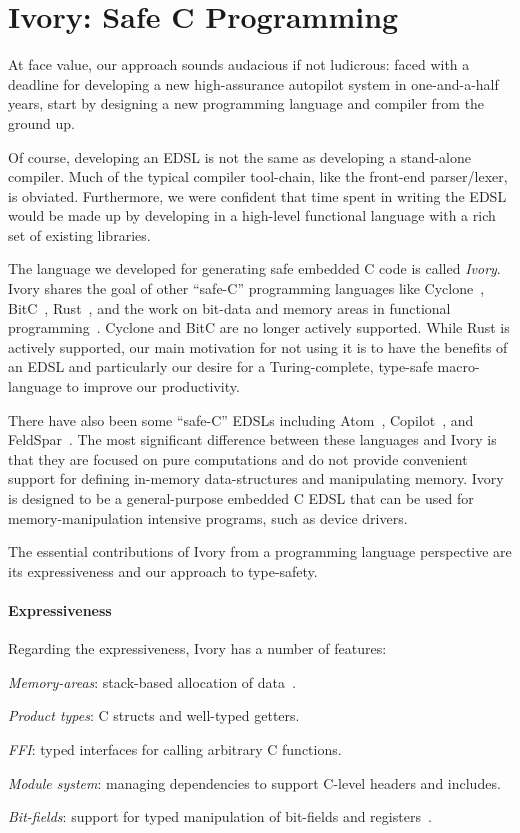 \section{Ivory: Safe C Programming}
\label{sec:ivory}

At face value, our approach sounds audacious if not ludicrous: faced with a
deadline for developing a new high-assurance autopilot system in one-and-a-half
years, start by designing a new programming language and compiler from the
ground up.

Of course, developing an EDSL is not the same as developing a stand-alone
compiler.  Much of the typical compiler tool-chain, like the front-end
parser/lexer, is obviated.  Furthermore, we were confident that time spent in
writing the EDSL would be made up by developing in a high-level functional
language with a rich set of existing libraries.

The language we developed for generating safe embedded C code is called
\emph{Ivory}.  Ivory shares the goal of other ``safe-C'' programming languages
like Cyclone~\cite{cyclone}, BitC~\cite{bitc}, Rust~\cite{rust}, and the work on
bit-data and memory areas in functional programming~\cite{high-level,memareas}.
Cyclone and BitC are no longer actively supported.  While Rust is actively
supported, our main motivation for not using it is to have the benefits of an
EDSL and particularly our desire for a Turing-complete, type-safe macro-language
to improve our productivity.

There have also been some ``safe-C'' EDSLs including Atom~\cite{atom},
Copilot~\cite{copilot}, and FeldSpar~\cite{feldspar1}.  The most significant
difference between these languages and Ivory is that they are focused on pure
computations and do not provide convenient support for defining in-memory
data-structures and manipulating memory.  Ivory is designed to be a
general-purpose embedded C EDSL that can be used for memory-manipulation
intensive programs, such as device drivers.

The essential contributions of Ivory from a programming language perspective are
its expressiveness and our approach to type-safety.

\paragraph{Expressiveness}
Regarding the expressiveness, Ivory has a number of features:

\begin{compactitem}
  \item \emph{Memory-areas}: stack-based allocation of data~\cite{memareas}.
  \item \emph{Product types}: C structs and well-typed getters.
  \item \emph{FFI}: typed interfaces for calling arbitrary C functions.
  \item \emph{Module system}: managing dependencies to support C-level headers and
    includes.
  \item \emph{Bit-fields}: support for typed manipulation of bit-fields and
    registers~\cite{high-level}.
\end{compactitem}

